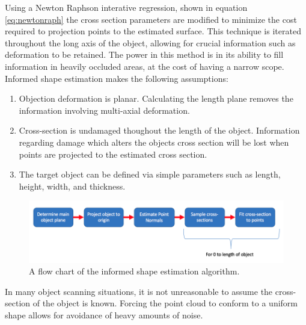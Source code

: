 \documentclass[12pt]{drexelthesis}
\begin{document}
Using a Newton Raphson interative regression, shown in equation \ref{eq:newtonraph} the cross section parameters are modified to minimize the cost required to projection points to the estimated surface. This technique is iterated throughout the long axis of the object, allowing for crucial information such as deformation to be retained. The power in this method is in its ability to fill information in heavily occluded areas, at the cost of having a narrow scope. Informed shape estimation makes the following assumptions:

\begin{enumerate}
	\item Objection deformation is planar. Calculating the length plane removes the information involving multi-axial deformation.
	\item Cross-section is undamaged thoughout the length of the object. Information regarding damage which alters the objects cross section will be lost when points are projected to the estimated cross section.
	\item The target object can be defined via simple parameters such as length, height, width, and thickness.
\end{enumerate}

\begin{figure}[!ht]
	\centering
		\includegraphics[width=5in]{cross-section-estimation/flowchart.png}
	\caption[Flow chart of informed shape estimation algorithm]{\centering A flow chart of the informed shape estimation algorithm.}
\end{figure}

In many object scanning situations, it is not unreasonable to assume the cross-section of the object is known. Forcing the point cloud to conform to a uniform shape allows for avoidance of heavy amounts of noise.
\end{document}
